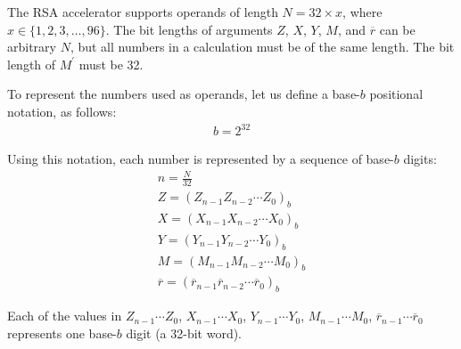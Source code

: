 \documentclass[main\_\_EN.tex]{subfiles}
\begin{document}
The RSA accelerator supports operands of length \begin{math}N = 32 \times x\end{math}, where \begin{math}x \in \{ 1,2,3, \dots, 96\} \end{math}. The bit lengths of arguments \begin{math}Z\end{math}, \begin{math}X\end{math}, \begin{math}Y\end{math}, \begin{math}M\end{math}, and \begin{math}\overline{r}\end{math}
can be arbitrary \begin{math}N\end{math}, but all numbers in a calculation must be of the same length. The bit length of \begin{math}M^{\prime}\end{math} must be 32.

To represent the numbers used as operands, let us define a base-\begin{math}b\end{math} positional notation, as follows:
\begin{gather*}
    b = 2^{32}
\end{gather*}

Using this notation, each number is represented by a sequence of base-\begin{math}b\end{math} digits:
\begin{gather*}
    n = \frac{N}{32} \\
    Z = ( Z_{n-1} Z_{n-2} \cdots Z_{0} )_{b} \\
    X = ( X_{n-1} X_{n-2} \cdots X_{0} )_{b} \\
    Y = ( Y_{n-1} Y_{n-2} \cdots Y_{0} )_{b} \\
    M = ( M_{n-1} M_{n-2} \cdots M_{0} )_{b} \\
    \overline{r} = ( \overline{r}_{n-1} \overline{r}_{n-2} \cdots \overline{r}_{0} )_{b}
\end{gather*}

Each of the values in
\begin{math}Z_{n-1} \cdots Z_{0}\end{math},
\begin{math}X_{n-1} \cdots X_{0}\end{math},
\begin{math}Y_{n-1} \cdots Y_{0}\end{math},
\begin{math}M_{n-1} \cdots M_{0}\end{math},
\begin{math}\overline{r}_{n-1}\cdots \overline{r}_{0}\end{math} represents one base-\begin{math}b\end{math} digit (a 32-bit word).
\end{document}

